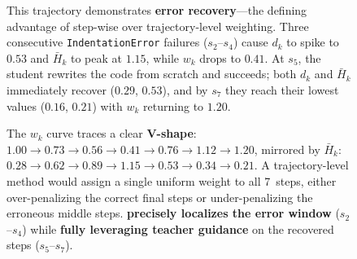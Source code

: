 \begin{figure}[t]
\begin{tcolorbox}
{\begin{tabular}{@{} c p{0.64\linewidth} c c c @{}}
\bottomrule
\end{tabular}
}

\vspace{8pt}

\begin{tcolorbox}[
  colback=blue!3, colframe=blue!50!black, boxrule=0.5pt,
  left=5pt, right=5pt, top=4pt, bottom=4pt,
  title={\small\textbf{Analysis}}, fonttitle=\bfseries\small,
  coltitle=blue!50!black, colbacktitle=blue!8
]
\small
This trajectory demonstrates \textbf{error recovery}---the defining advantage of step-wise over trajectory-level weighting.
Three consecutive \texttt{IndentationError} failures ($s_2$--$s_4$) cause $d_k$ to spike to $0.53$ and $\bar{H}_k$ to peak at $1.15$, while $w_k$ drops to $0.41$. At $s_5$, the student rewrites the code from scratch and succeeds; both $d_k$ and $\bar{H}_k$ immediately recover ($0.29$, $0.53$), and by $s_7$ they reach their lowest values ($0.16$, $0.21$) with $w_k$ returning to $1.20$.

The $w_k$ curve traces a clear \textbf{V-shape}: $1.00 \to 0.73 \to 0.56 \to 0.41 \to 0.76 \to 1.12 \to 1.20$, mirrored by $\bar{H}_k$: $0.28 \to 0.62 \to 0.89 \to 1.15 \to 0.53 \to 0.34 \to 0.21$.
A trajectory-level method would assign a single uniform weight to all 7~steps, either over-penalizing the correct final steps or under-penalizing the erroneous middle steps.
\ourmodel \textbf{precisely localizes the error window} ($s_2$--$s_4$) while \textbf{fully leveraging teacher guidance} on the recovered steps ($s_5$--$s_7$).
\end{tcolorbox}

\end{tcolorbox}


\label{fig:case-study-c}
\end{figure}
